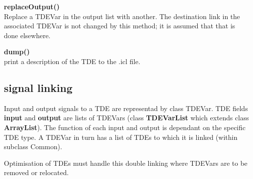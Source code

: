     {\bf replaceOutput()} \\ Replace a TDEVar in the output list with another.
    The destination link in the associated TDEVar is not changed by this method;
    it is assumed that that is done elsewhere.
    
    {\bf dump()} \\ print a description of the TDE to the .icl file.


\subsection{signal linking}

    Input and output signals to a TDE are representad by class TDEVar.
    TDE fields {\bf input} and {\bf output} are lists of TDEVars (class
    {\bf TDEVarList} which extends class {\bf ArrayList}). The function of
    each input and output is dependant on the specific TDE type. A TDEVar
    in turn has a list of TDEs to which it is linked (within subclass Common).
    
    Optimisation of TDEs must handle this double linking where TDEVars are
    to be removed or relocated.
    
